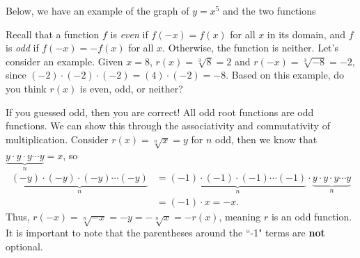 \documentclass{ximera}
\begin{document}
\begin{example}
Below, we have an example of the graph of $y=x^5$ and the two functions

\begin{image}
\end{image}

\end{example}

Recall that a function $f$ is {\em even} if $f(-x) = f(x)$ for all $x$ in its domain, and $f$ is {\em odd} if $f(-x) = -f(x)$ for all $x$. Otherwise, the function is neither. %
Let's consider an example. Given $x=8$, $r(x) = \sqrt[3]{8}=2$ and $r(-x) = \sqrt[3]{-8} = -2$, since $(-2)\cdot(-2)\cdot(-2) =(4)\cdot(-2) = -8$. Based on this example, do you think $r(x)$ is even, odd, or neither?

If you guessed odd, then you are correct! All odd root functions are odd functions. We can show this through the associativity and commutativity of multiplication. 
Consider $r(x) = \sqrt[n]{x} = y$ for $n$ odd, then we know that $\underbrace{y \cdot y \cdot y \cdots y}_n=x$, so
\begin{align*}
\underbrace{(-y) \cdot (-y) \cdot (-y) \cdots (-y)}_n 
&= \underbrace{(-1) \cdot (-1) \cdot (-1) \cdots (-1)}_n \cdot \underbrace{y \cdot y \cdot y \cdots y}_n \\
&= (-1) \cdot x = -x.
\end{align*}
Thus, $r(-x) = \sqrt[n]{-x} = -y = -\sqrt[n]{x} = -r(x)$, meaning $r$ is an odd function.
It is important to note that the parentheses around the ``-1" terms are {\bf not} optional. 
\end{document}

